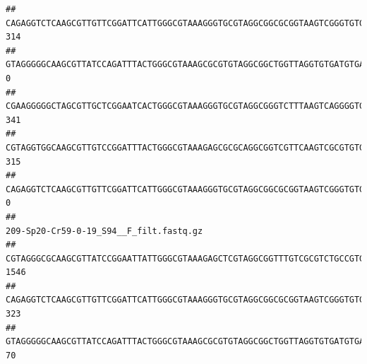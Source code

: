 \documentclass[]{article}
\begin{document}
\begin{verbatim}
## CAGAGGTCTCAAGCGTTGTTCGGATTCATTGGGCGTAAAGGGTGCGTAGGCGGCGCGGTAAGTCGGGTGTGAAATCTCGGAGCTTAACTCCGAAACTGCATTCGATACTGCCGTGCTTGAGGACTGGAGAGGAGACTGGAATTTACGGTGTAGCGGTGAAATGCGTAGATATCGTAAGGAAGACCAGTGGCGAAGGCGGGTCTCTGGACAGTTCCTGACGCTGAGGCACGAAGGCCAGGGGAGCAAACG                                     314
## GTAGGGGGCAAGCGTTATCCAGATTTACTGGGCGTAAAGCGCGTGTAGGCGGCTGGTTAGGTGTGATGTGAAATCTTCCGGCTCAACCGGAAAACTGCATTGCAAACCGGCCTGGCTAGAGTGCAGGAGAGGGAAGCGGAATTCCAGGTGTAGCGGTGAAATGCGTAGATATCTGGAGGAACACCAGTGGCGAAGGCGGCTTCCTGGCCTGCAACTGACGCTGAGACGCGAAAGCGTGGGGAGCGAAC                                        0
## CGAAGGGGGCTAGCGTTGCTCGGAATCACTGGGCGTAAAGGGTGCGTAGGCGGGTCTTTAAGTCAGGGGTGAAATCCTGGAGCTCAACTCCAGAACTGCCTTTGATACTGAAGATCTTGAGTTCGGGAGAGGTGAGTGGAACTGCGAGTGTAGAGGTGAAATTCGTAGATATTCGCAAGAACACCAGTGGCGAAGGCGGCTCACTGGCCCGATACTGACGCTGAGGCACGAAAGCGTGGGGAGCAAACA                                     341
## CGTAGGTGGCAAGCGTTGTCCGGATTTACTGGGCGTAAAGAGCGCGCAGGCGGTCGTTCAAGTCGCGTGTGAAAGCCCCCGGCTCAACTGGGGAGGGTCACGCGATACTGATCGACTCGAAGGCAGGAGAGGGTAGTGGAATTCCCGGTGTAGTGGTGAAATGCGTAGATATCGGGAGGAACACCAGTGGCGAAGGCGACTACCTGGCCTGTTCTTGACGCTGAGGCGCGAAAGCTAGGGGAGCAAACG                                     315
## CAGAGGTCTCAAGCGTTGTTCGGATTCATTGGGCGTAAAGGGTGCGTAGGCGGCGCGGTAAGTCGGGTGTGAAATCTCGGGGCTTAACTCCGAAACTGCATTCGATACTGCCGTGCTTGAGGACTGGAGAGGAGACTGGAATTTACGGTGTAGCGGTGAAATGCGTAGATATCGTAAGGAAGACCAGTGGCGAAGGCGGGTCTCTGGACAGTTCCTGACGCTGAGGCACGAAGGCCAGGGGAGCAAACG                                       0
##                                                                                                                                                                                                                                                           209-Sp20-Cr59-0-19_S94__F_filt.fastq.gz
## CGTAGGGCGCAAGCGTTATCCGGAATTATTGGGCGTAAAGAGCTCGTAGGCGGTTTGTCGCGTCTGCCGTGAAAGTCCGGGGCTCAACTCCGGATCTGCGGTGGGTACGGGCAGACTAGAGTGATGTAGGGGAGACTGGAATTCCTGGTGTAGCGGTGAAATGCGCAGATATCAGGAGGAACACCGATGGCGAAGGCAGGTCTCTGGGCATTAACTGACGCTGAGGAGCGAAAGCATGGGGAGCGAACA                                    1546
## CAGAGGTCTCAAGCGTTGTTCGGATTCATTGGGCGTAAAGGGTGCGTAGGCGGCGCGGTAAGTCGGGTGTGAAATCTCGGAGCTTAACTCCGAAACTGCATTCGATACTGCCGTGCTTGAGGACTGGAGAGGAGACTGGAATTTACGGTGTAGCGGTGAAATGCGTAGATATCGTAAGGAAGACCAGTGGCGAAGGCGGGTCTCTGGACAGTTCCTGACGCTGAGGCACGAAGGCCAGGGGAGCAAACG                                     323
## GTAGGGGGCAAGCGTTATCCAGATTTACTGGGCGTAAAGCGCGTGTAGGCGGCTGGTTAGGTGTGATGTGAAATCTTCCGGCTCAACCGGAAAACTGCATTGCAAACCGGCCTGGCTAGAGTGCAGGAGAGGGAAGCGGAATTCCAGGTGTAGCGGTGAAATGCGTAGATATCTGGAGGAACACCAGTGGCGAAGGCGGCTTCCTGGCCTGCAACTGACGCTGAGACGCGAAAGCGTGGGGAGCGAAC                                       70

\end{verbatim}
\end{document}
